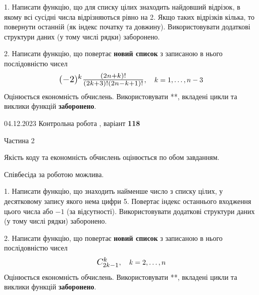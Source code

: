 \documentclass[12pt, ukrainian]{article}
\begin{document}
{{{{{{{{{{{{{{{{{\begin {Large}
1. Написати функцію, що для списку цілих знаходить найдовший відрізок, в якому всі сусідні числа відрізняються рівно на 2. Якщо таких відрізків кілька, то повернути останній (як індекс початку та довжину). Використовувати додаткові структури даних (у тому числі рядки) заборонено.

\vspace{10mm}



2. 
Написати функцію, що повертає \textbf{новий список} з записаною в нього послідовністю чисел
$$\scalebox{1.3}{$(-2)^{k}\frac{(2n+k)!}{(2k+3)!(2n-k+1)!}$}, \quad k=1,\ldots,n-3$$
Оцінюється економність обчислень. Використовувати **, вкладені цикли та виклики функцій \textbf{заборонено}.

\end{Large}\newpage




\begin {Huge}
{{04.12.2023 Контрольна робота , варіант  \No \textbf { 118 }\par}}

\begin{center}Частина 2
\end{center}
\vspace{10mm}
\end {Huge}

{
\begin {Large}
Якість коду та економність обчислень оцінюється по обом завданням.

Співбесіда за роботою можлива.

\vspace{5mm}

1. Написати функцію, що знаходить найменше число з списку цілих, у десятковому запису якого нема цифри 5. Повертає індекс останнього входження цього числа або $-1$ (за відсутності). Використовувати додаткові структури даних (у тому числі рядки) заборонено.

\vspace{10mm}



2. 
Написати функцію, що повертає \textbf{новий список} з записаною в нього послідовністю чисел
$$\scalebox{1.2}{$C_{2k-1}^{k}$}, \quad k=2,\ldots,n$$
Оцінюється економність обчислень. Використовувати **, вкладені цикли та виклики функцій \textbf{заборонено}.

\end{Large}\newpage

}}}}}}}}}}}}}}}}}}
\end{document}
